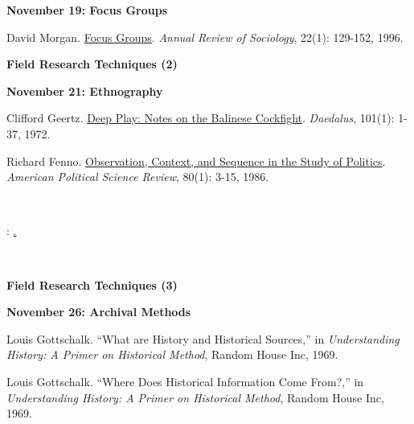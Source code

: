 \documentclass[letterpaper]{article}
\renewenvironment{itemize}{
  \begin{list}{}{
    \setlength{\leftmargin}{1.5em}
  }
}{
  \end{list}
}
\begin{document}
\begin{enumerate}
				\begin{itemize}
		\item {\bf November 19: Focus Groups}
			\begin{itemize}
				\item[$\bullet$] David Morgan. \href{http://www.jstor.org/stable/2083427}{Focus Groups}. \emph{Annual Review of Sociology}, 22(1): 129-152, 1996.
			\end{itemize}
		\end{itemize}

\item {\bf Field Research Techniques (2)}
		
		\begin{itemize}
		\item {\bf November 21: Ethnography}
			\begin{itemize}
				\item[$\bullet$] Clifford Geertz. \href{http://www.jstor.org/stable/20024056}{Deep Play: Notes on the Balinese Cockfight}. \emph{Daedalus}, 101(1): 1-37, 1972.  
				\item[$\bullet$] Richard Fenno. \href{http://www.jstor.org/stable/1957081}{Observation, Context, and Sequence in the Study of Politics}. \emph{American Political Science Review}, 80(1): 3-15, 1986. 
			\end{itemize}
		\end{itemize}

~\\
\item[] \begin{center}{\color{blue}{\bf Research Design Due}: \underline{{\unskip}.}}\end{center}
~\\

\item {\bf Field Research Techniques (3)}
		
		\begin{itemize}
		\item {\bf November 26: Archival Methods}
			\begin{itemize}
				\item[$\bullet$] Louis Gottschalk. ``What are History and Historical Sources,'' in \emph{Understanding History: A Primer on Historical Method}, Random House Inc, 1969.
				\item[$\bullet$] Louis Gottschalk. ``Where Does Historical Information Come From?,'' in \emph{Understanding History: A Primer on Historical Method}, Random House Inc, 1969. 
			\end{itemize}
		\end{itemize}



\end{enumerate}
\end{document}
